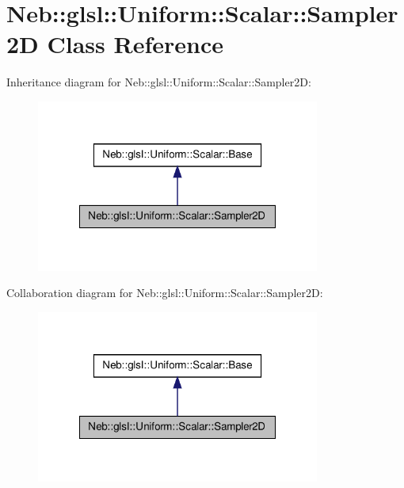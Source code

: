 \hypertarget{classNeb_1_1glsl_1_1Uniform_1_1Scalar_1_1Sampler2D}{\section{\-Neb\-:\-:glsl\-:\-:\-Uniform\-:\-:\-Scalar\-:\-:\-Sampler2\-D \-Class \-Reference}
\label{classNeb_1_1glsl_1_1Uniform_1_1Scalar_1_1Sampler2D}
}


\-Inheritance diagram for \-Neb\-:\-:glsl\-:\-:\-Uniform\-:\-:\-Scalar\-:\-:\-Sampler2\-D\-:\nopagebreak
\begin{figure}[H]
\begin{center}
\leavevmode
\includegraphics[width=264pt]{classNeb_1_1glsl_1_1Uniform_1_1Scalar_1_1Sampler2D__inherit__graph}
\end{center}
\end{figure}


\-Collaboration diagram for \-Neb\-:\-:glsl\-:\-:\-Uniform\-:\-:\-Scalar\-:\-:\-Sampler2\-D\-:\nopagebreak
\begin{figure}[H]
\begin{center}
\leavevmode
\includegraphics[width=264pt]{classNeb_1_1glsl_1_1Uniform_1_1Scalar_1_1Sampler2D__coll__graph}
\end{center}
\end{figure}
